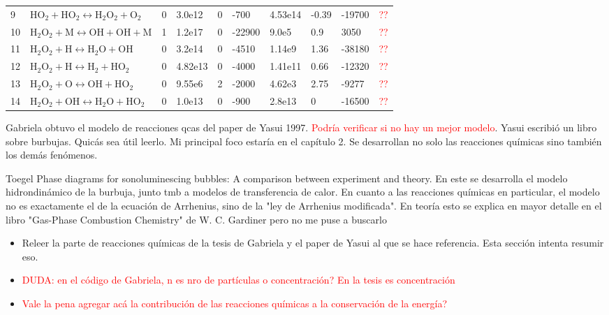 \documentclass[aps,prb,onecolumn,superscriptaddress,floatfix,longbibliography,10pt]{revtex4-2}
\begin{document}
\begin{table}[]
\begin{tabular}{llllllllll}
  9  & $\mathrm{HO_2 + HO_2 \leftrightarrow H_2O_2 + O_2}$ & 0      &3.0e12           &0  &-700  &4.53e14  &-0.39  & -19700 & \textcolor{red}{??} \\
  10  & $\mathrm{H_2O_2 + M \leftrightarrow OH + OH + M}$ & 1      &1.2e17           &0  &-22900  &9.0e5  &0.9  & 3050 & \textcolor{red}{??} \\
  11  & $\mathrm{H_2O_2 + H \leftrightarrow H_2O + OH}$ & 0      &3.2e14           &0  &-4510  &1.14e9  &1.36  & -38180 & \textcolor{red}{??} \\
  12  & $\mathrm{H_2O_2 + H \leftrightarrow H_2 + HO_2}$ & 0      &4.82e13           &0  &-4000  &1.41e11  &0.66  & -12320  & \textcolor{red}{??} \\
  13  & $\mathrm{H_2O_2 + O \leftrightarrow OH + HO_2}$ & 0      &9.55e6           &2  &-2000  &4.62e3  &2.75  & -9277 & \textcolor{red}{??} \\
  14  & $\mathrm{H_2O_2 + OH \leftrightarrow H_2O + HO_2}$ & 0      &1.0e13           &0  &-900  &2.8e13  &0  & -16500 & \textcolor{red}{??} \\ \hline
\end{tabular}
\end{table}







Gabriela obtuvo el modelo de reacciones qcas del paper de Yasui 1997. \textcolor{red}{Podría verificar si no hay un mejor modelo}.
Yasui escribió un libro sobre burbujas. Quicás sea útil leerlo. Mi principal foco estaría en el capítulo 2. Se desarrollan no solo las reacciones químicas sino también los demás fenómenos.

Toegel Phase diagrams for sonoluminescing bubbles: A comparison between experiment and theory. En este se desarrolla el modelo hidrondinámico de la burbuja, junto tmb a modelos de transferencia de calor. En cuanto a las reacciones químicas en particular, el modelo no es exactamente el de la ecuación de Arrhenius, sino de la "ley de Arrhenius modificada". En teoría esto se explica en mayor detalle en el libro "Gas-Phase Combustion Chemistry" de W. C. Gardiner pero no me puse a buscarlo



\begin{itemize}
  \item Releer la parte de reacciones químicas de la tesis de Gabriela y el paper de Yasui al que se hace referencia. Esta sección intenta resumir eso.
  \item \textcolor{red}{DUDA: en el código de Gabriela, n es nro de partículas o concentración? En la tesis es concentración}
  \item \textcolor{red}{Vale la pena agregar acá la contribución de las reacciones químicas a la conservación de la energía?}
\end{itemize}
\end{document}
